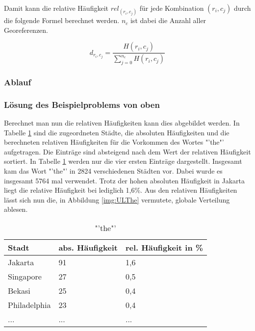				Damit kann die relative Häufigkeit $rel_{(r_i,c_j)}$ für jede Kombination $(r_i,c_j)$ durch die folgende Formel berechnet werden. 
				$n_c$ ist dabei die Anzahl aller Georeferenzen.

				\begin{equation}
					d_{r_i,c_j}=\frac{H(r_i,c_j)}{\sum^{n_c}_{j=0}{H(r_i,c_j)}}
				\end{equation}	

			\subsubsection{Ablauf}

			\subsubsection{Lösung des Beispielproblems von oben}

				Berechnet man nun die relativen Häufigkeiten kann dies abgebildet werden.
				In Tabelle \ref{tab:the} sind die zugeordneten Städte, die absoluten Häufigkeiten und die berechneten relativen Häufigkeiten für die Vorkommen des Wortes "'the"' aufgetragen. 
				Die Einträge sind absteigend nach dem Wert der relativen Häufigkeit sortiert.
				In Tabelle \ref{tab:the} werden nur die vier ersten Einträge dargestellt.  
				Insgesamt kam das Wort "'the"' in 2824 verschiedenen Städten vor.
				Dabei wurde es insgesamt 5764 mal verwendet. 
				Trotz der hohen absoluten Häufigkeit in Jakarta liegt die relative Häufigkeit bei lediglich 1,6\%.
				Aus den relativen Häufigkeiten lässt sich nun die, in Abbildung \ref{img:ULThe} vermutete, globale Verteilung ablesen.


				\begin{table}[h]
				\centering
				\caption{"'the"'}
				\label{tab:the}
				\begin{tabular}{|l|l|l|}
				\hline
				Stadt             & abs. Häufigkeit & rel. Häufigkeit in \% \\ \hline \hline
				Jakarta           & 91              & 1,6                       \\ \hline
				Singapore         & 27              & 0,5                       \\ \hline
				Bekasi            & 25              & 0,4                       \\ \hline
				Philadelphia      & 23              & 0,4                       \\ \hline
				... & ... & ... \\ \hline
				\end{tabular}
				\end{table}

